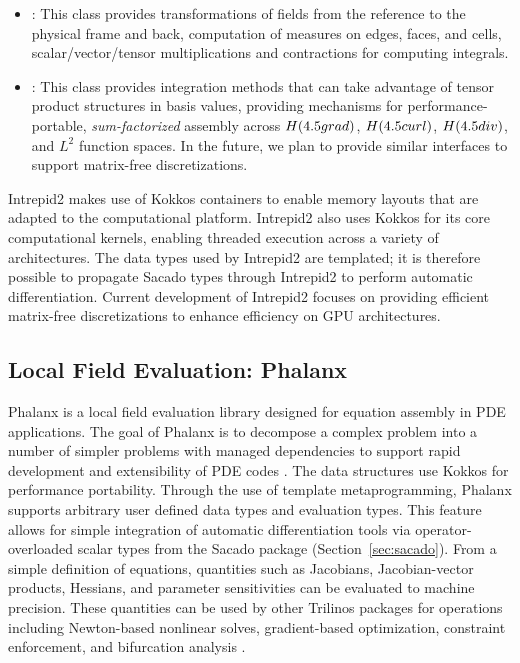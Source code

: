 \begin{itemize}
\item {}: This class provides transformations of fields from the reference to the physical frame and back, computation of measures on edges, faces, and cells, scalar/vector/tensor multiplications and contractions for computing integrals.
\item {}: This class provides integration methods that can take advantage of tensor product structures in basis values, providing mechanisms for performance\hyp{}portable, \emph{sum-factorized} assembly across $H({\rm grad})$, $H({\rm curl})$, $H({\rm div})$, and $L^2$ function spaces. In the future, we plan to provide similar interfaces to support matrix-free discretizations.
\end{itemize}
Intrepid2 makes use of Kokkos containers to enable memory layouts that are adapted to the computational platform. Intrepid2 also uses Kokkos for its core computational kernels, enabling threaded execution across a variety of architectures. The data types used by Intrepid2 are templated; it is therefore possible to propagate Sacado types through Intrepid2 to perform automatic differentiation. Current development of Intrepid2 focuses on providing efficient matrix-free discretizations to enhance efficiency on GPU architectures.

\subsection{Local Field Evaluation: Phalanx}
Phalanx is a local field evaluation library designed for equation assembly in PDE applications. The goal of Phalanx is to decompose a complex problem into a number of simpler problems with managed dependencies to support rapid development and extensibility of PDE codes \cite{Notz2012,pawlowski2012automating,pawlowski2012automatingpart2}. The data structures use Kokkos for performance portability. Through the use of template metaprogramming, Phalanx supports arbitrary user defined data types and evaluation types. This feature allows for simple integration of automatic differentiation tools via operator-overloaded scalar types from the Sacado package (Section~\ref{sec:sacado}). From a simple definition of equations, quantities such as Jacobians, Jacobian-vector products, Hessians, and parameter sensitivities can be evaluated to machine precision. These quantities can be used by other Trilinos packages for operations including Newton-based nonlinear solves, gradient-based optimization, constraint enforcement, and bifurcation analysis \cite{pawlowski2012automating,pawlowski2012automatingpart2}.

